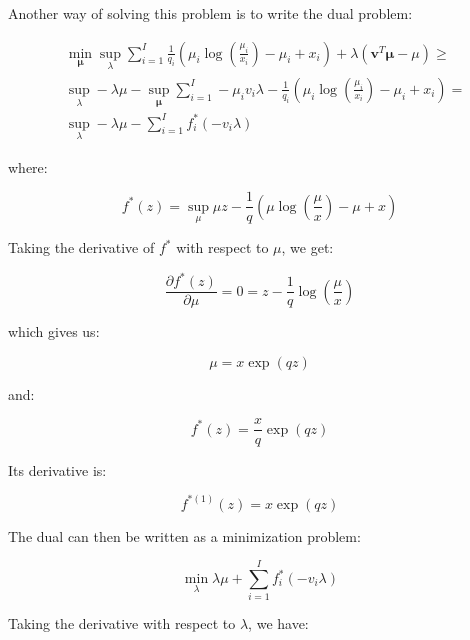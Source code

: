 \documentclass{tex/note}
\begin{document}
Another way of solving this problem is to write the dual problem:

\begin{align*}
& \min_{\bm{\mu}} \sup_{\lambda} \sum_{i = 1}^I \frac{1}{q_i} \left( \mu_i \log \left( \frac{\mu_i}{x_i} \right) - \mu_i + x_i \right) + \lambda \left( \bm{v}^T \bm{\mu} - \mu \right) \geq \\
& \sup_{\lambda} - \lambda \mu - \sup_{\bm{\mu}} \sum_{i = 1}^I - \mu_i v_i \lambda - \frac{1}{q_i} \left( \mu_i \log \left( \frac{\mu_i}{x_i} \right) - \mu_i + x_i \right) = \\
& \sup_{\lambda} - \lambda \mu - \sum_{i = 1}^I f_i^* \left( - v_i \lambda \right)
\end{align*}

where:

\begin{equation*}
f^* \left( z \right) = \sup_{\mu} \mu z - \frac{1}{q} \left( \mu \log \left( \frac{\mu}{x} \right) - \mu + x \right)
\end{equation*}

Taking the derivative of $f^*$ with respect to $\mu$, we get:

\begin{equation*}
\frac{\partial f^* \left( z \right)}{\partial \mu} = 0 = z - \frac{1}{q} \log \left( \frac{\mu}{x} \right)
\end{equation*}

which gives us:

\begin{equation*}
\mu = x \exp \left( q z \right)
\end{equation*}

and:

\begin{equation*}
f^* \left( z \right) = \frac{x}{q} \exp \left( q z \right)
\end{equation*}

Its derivative is:

\begin{equation*}
f^{* \left( 1 \right)} \left( z \right) = x \exp \left( q z \right)
\end{equation*}

The dual can then be written as a minimization problem:

\begin{equation*}
\min_\lambda \lambda \mu + \sum_{i = 1}^I f_i^* \left( - v_i \lambda \right)
\end{equation*}

Taking the derivative with respect to $\lambda$, we have:
\end{document}
